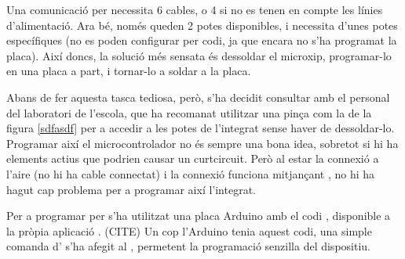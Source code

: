 Una comunicació per  necessita 6 cables, o 4 si no es tenen en compte
les línies d'alimentació. Ara bé, només queden 2 potes disponibles, i 
necessita d'unes potes específiques (no es poden configurar per codi, ja que
encara no s'ha programat la placa). Així doncs, la solució més sensata és
dessoldar el microxip, programar-lo en una placa a part, i tornar-lo a soldar
a la placa.

Abans de fer aquesta tasca tediosa, però, s'ha decidit consultar amb el
personal del laboratori de l'escola, que ha recomanat utilitzar una pinça com
la de la figura \ref{sdfasdf} per a accedir a les potes de l'integrat sense haver
de dessoldar-lo. Programar així el microcontrolador no és sempre una bona idea,
sobretot si hi ha elements actius que podrien causar un curtcircuit. Però al estar
la connexió  a l'aire (no hi ha cable connectat) i la connexió
 funciona mitjançant , no hi ha hagut cap problema per
a programar així l'integrat.

Per a programar per  s'ha utilitzat una placa Arduino amb el codi
, disponible a la pròpia aplicació . (CITE) Un cop
l'Arduino tenia aquest codi, una simple comanda d' s'ha afegit
al , permetent la programació senzilla del dispositiu.
